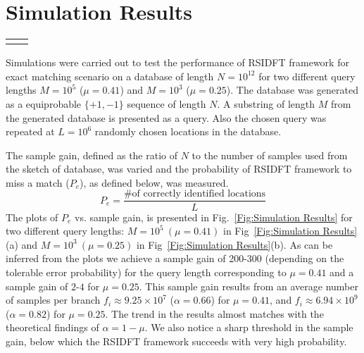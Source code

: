 \section{Simulation Results}


\begin{figure*}[ht]
		\begin{tabular}{cc}
			\subfloat[$M=10^5(\mu=0.41), \tilde{N}=10^7, ~G=10^{5}$]{}&
			\subfloat[$M=10^3(\mu=0.25),~ \tilde{N}=10^6, ~G=10^{6}$]{}
		\end{tabular}
		
		\caption{Plots of probability of missing a match vs. sample gain for exact matching of a query of length $M$ from a equiprobable  binary \{+1,-1\} sequence of length $N= 10^{12}$, divided into $G$ blocks each of length $\tilde{N}$. The substring was simulated to repeat in $L=10^6$($\lambda=0.5$) locations uniformly at random.} \label{Fig:Simulation Results}
\end{figure*}

Simulations were carried out to test the performance of RSIDFT framework for exact matching scenario on a database of length $N=10^{12}$ for two different query lengths $M=10^5$ ($\mu = 0.41$) and $M=10^3$ ($\mu = 0.25$). The database was generated as a equiprobable $\{+1,-1\}$ sequence of length $N$. A substring of length $M$ from the generated database is presented as a query. Also the chosen query was repeated at $L=10^6$ randomly chosen locations in the database.

The sample gain, defined as the ratio of $N$ to the number of samples used from the sketch of database, was varied and the probability of RSIDFT framework to miss a match ($P_e$), as defined below, was measured.
\[P_e = \frac{\text{\# of correctly identified locations}}{L} \]   
The plots of $P_e$ vs. sample gain, is presented in Fig.~\ref{Fig:Simulation Results} for two different query lengths: $M=10^5~(\mu=0.41)$ in Fig~\ref{Fig:Simulation Results}(a) and $M=10^3~(\mu=0.25)$ in Fig~\ref{Fig:Simulation Results}(b). As can be inferred from the plots we achieve a sample gain of 200-300 (depending on the tolerable error probability) for the query length corresponding to  $\mu=0.41$ and a sample gain of $2$-$4$ for $\mu=0.25$. This sample gain results from an average number of samples per branch $f_i \approx 9.25 \times10^7 $ ($\alpha=0.66$) for $\mu=0.41$, and  $f_i \approx 6.94\times10^9 $ ($\alpha=0.82$) for $\mu=0.25$. The trend in the results almost matches with the theoretical findings of $\alpha = 1-\mu$. We also notice a sharp threshold in the sample gain, below which the RSIDFT framework succeeds with very high probability. 
 		
